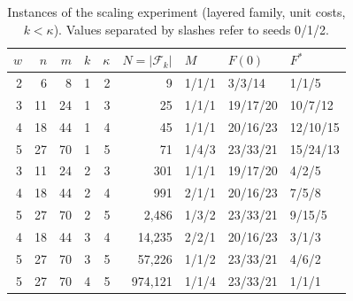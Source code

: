 \begin{table}[t]
\centering
\caption{Instances of the scaling experiment (layered family, unit costs, $k<\kappa$). Values separated by slashes refer to seeds 0/1/2.}\label{tab:instances}
\small
\begin{tabular}{rrrrrrlll}
\toprule
$w$ & $n$ & $m$ & $k$ & $\kappa$ & $N=|\mathcal{F}_k|$ & $M$ & $F(0)$ & $F^{*}$ \\
\midrule
2 & 6 & 8 & 1 & 2 & 9 & 1/1/1 & 3/3/14 & 1/1/5 \\
3 & 11 & 24 & 1 & 3 & 25 & 1/1/1 & 19/17/20 & 10/7/12 \\
4 & 18 & 44 & 1 & 4 & 45 & 1/1/1 & 20/16/23 & 12/10/15 \\
5 & 27 & 70 & 1 & 5 & 71 & 1/4/3 & 23/33/21 & 15/24/13 \\
3 & 11 & 24 & 2 & 3 & 301 & 1/1/1 & 19/17/20 & 4/2/5 \\
4 & 18 & 44 & 2 & 4 & 991 & 2/1/1 & 20/16/23 & 7/5/8 \\
5 & 27 & 70 & 2 & 5 & 2{,}486 & 1/3/2 & 23/33/21 & 9/15/5 \\
4 & 18 & 44 & 3 & 4 & 14{,}235 & 2/2/1 & 20/16/23 & 3/1/3 \\
5 & 27 & 70 & 3 & 5 & 57{,}226 & 1/1/2 & 23/33/21 & 4/6/2 \\
5 & 27 & 70 & 4 & 5 & 974{,}121 & 1/1/4 & 23/33/21 & 1/1/1 \\
\bottomrule
\end{tabular}
\end{table}
